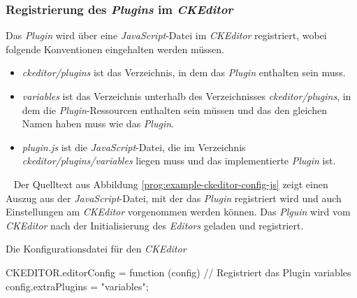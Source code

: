 \subsubsection{Registrierung des \emph{Plugins} im \emph{CKEditor}}
Das \emph{Plugin} wird über eine \emph{JavaScript}-Datei im \emph{CKEditor} registriert, wobei folgende Konventionen eingehalten werden müssen.
\begin{itemize}
	\item\emph{ckeditor/plugins}
	\newline
	ist das Verzeichnis, in dem das \emph{Plugin} enthalten sein muss.
	\item\emph{variables}
	\newline
	ist das Verzeichnis unterhalb des Verzeichnisses \emph{ckeditor/plugins}, in dem die \emph{Plugin}-Ressourcen enthalten sein müssen und das den gleichen Namen haben muss wie das \emph{Plugin}.
	\item\emph{plugin.js}
	\newline
	ist die \emph{JavaScript}-Datei, die im Verzeichnis \emph{ckeditor/plugins/variables} liegen muss und das implementierte \emph{Plugin} ist. 
\end{itemize}
\ \newline
Der Quelltext aus Abbildung \ref{prog:example-ckeditor-config-js} zeigt einen Auszug aus der \emph{JavaScript}-Datei, mit der das \emph{Plugin} registriert wird und auch Einstellungen am \emph{CKEditor} vorgenommen werden können. Das \emph{Plguin} wird vom \emph{CKEditor} nach der Initialisierung des \emph{Editors} geladen und registriert.

\begin{program}[h]
\caption{Die Konfigurationsdatei für den \emph{CKEditor}}
\label{prog:example-ckeditor-config-js}
\begin{JsCode}
CKEDITOR.editorConfig = function (config) {
    // Registriert das Plugin variables
    config.extraPlugins = "variables";
}
\end{JsCode} 
\end{program}

